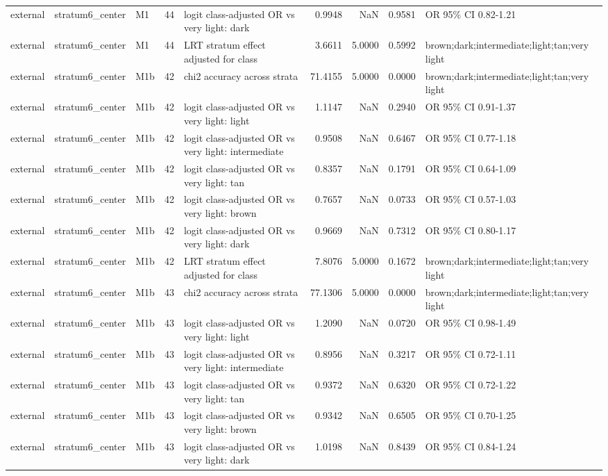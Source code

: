 \begin{tabular}{lllrlrrrl}
external & stratum6\_center & M1 & 44 & logit class-adjusted OR vs very light: dark & 0.9948 & NaN & 0.9581 & OR 95\% CI 0.82-1.21 \\
external & stratum6\_center & M1 & 44 & LRT stratum effect adjusted for class & 3.6611 & 5.0000 & 0.5992 & brown;dark;intermediate;light;tan;very light \\
external & stratum6\_center & M1b & 42 & chi2 accuracy across strata & 71.4155 & 5.0000 & 0.0000 & brown;dark;intermediate;light;tan;very light \\
external & stratum6\_center & M1b & 42 & logit class-adjusted OR vs very light: light & 1.1147 & NaN & 0.2940 & OR 95\% CI 0.91-1.37 \\
external & stratum6\_center & M1b & 42 & logit class-adjusted OR vs very light: intermediate & 0.9508 & NaN & 0.6467 & OR 95\% CI 0.77-1.18 \\
external & stratum6\_center & M1b & 42 & logit class-adjusted OR vs very light: tan & 0.8357 & NaN & 0.1791 & OR 95\% CI 0.64-1.09 \\
external & stratum6\_center & M1b & 42 & logit class-adjusted OR vs very light: brown & 0.7657 & NaN & 0.0733 & OR 95\% CI 0.57-1.03 \\
external & stratum6\_center & M1b & 42 & logit class-adjusted OR vs very light: dark & 0.9669 & NaN & 0.7312 & OR 95\% CI 0.80-1.17 \\
external & stratum6\_center & M1b & 42 & LRT stratum effect adjusted for class & 7.8076 & 5.0000 & 0.1672 & brown;dark;intermediate;light;tan;very light \\
external & stratum6\_center & M1b & 43 & chi2 accuracy across strata & 77.1306 & 5.0000 & 0.0000 & brown;dark;intermediate;light;tan;very light \\
external & stratum6\_center & M1b & 43 & logit class-adjusted OR vs very light: light & 1.2090 & NaN & 0.0720 & OR 95\% CI 0.98-1.49 \\
external & stratum6\_center & M1b & 43 & logit class-adjusted OR vs very light: intermediate & 0.8956 & NaN & 0.3217 & OR 95\% CI 0.72-1.11 \\
external & stratum6\_center & M1b & 43 & logit class-adjusted OR vs very light: tan & 0.9372 & NaN & 0.6320 & OR 95\% CI 0.72-1.22 \\
external & stratum6\_center & M1b & 43 & logit class-adjusted OR vs very light: brown & 0.9342 & NaN & 0.6505 & OR 95\% CI 0.70-1.25 \\
external & stratum6\_center & M1b & 43 & logit class-adjusted OR vs very light: dark & 1.0198 & NaN & 0.8439 & OR 95\% CI 0.84-1.24 \\

\end{tabular}

